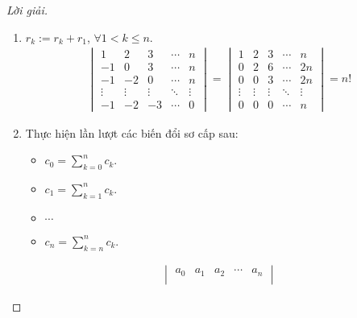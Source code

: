 \documentclass[class=nhvh-linear-algebra,crop=false]{standalone}
\begin{document}
\begin{proof}[Lời giải]
    \begin{enumerate}[label = (\alph*)]
        \item $r_{k}:= r_{k} + r_{1}$, $\forall 1 < k\le n$.
              \begin{align*}
                  \begin{vmatrix}
                      1      & 2      & 3      & \cdots & n      \\
                      -1     & 0      & 3      & \cdots & n      \\
                      -1     & -2     & 0      & \cdots & n      \\
                      \vdots & \vdots & \vdots & \ddots & \vdots \\
                      -1     & -2     & -3     & \cdots & 0
                  \end{vmatrix}
                  =
                  \begin{vmatrix}
                      1      & 2      & 3      & \cdots & n      \\
                      0      & 2      & 6      & \cdots & 2n     \\
                      0      & 0      & 3      & \cdots & 2n     \\
                      \vdots & \vdots & \vdots & \ddots & \vdots \\
                      0      & 0      & 0      & \cdots & n
                  \end{vmatrix}
                  = n!
              \end{align*}
        \item Thực hiện lần lượt các biến đổi sơ cấp sau:
              \begin{itemize}
                  \item $c_{0} = \displaystyle\sum^{n}_{k=0}c_{k}$.
                  \item $c_{1} = \displaystyle\sum^{n}_{k=1}c_{k}$.
                  \item $\cdots$
                  \item $c_{n} = \displaystyle\sum^{n}_{k=n}c_{k}$.
              \end{itemize}
              \begingroup{}
              \allowdisplaybreaks{}
              \begin{align*}
                  \begin{vmatrix}
                      a_{0}  & a_{1}  & a_{2}  & \cdots & a_{n}  \\

\end{vmatrix}
\end{align*}
\end{enumerate}
\end{proof}
\end{document}
